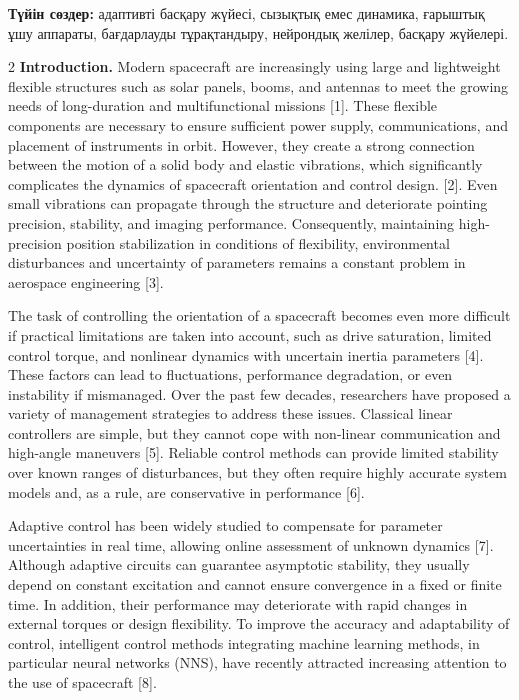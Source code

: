 {\bfseries Түйін сөздер:} адаптивті басқару жүйесі, сызықтық емес динамика,
ғарыштық ұшу аппараты, бағдарлауды тұрақтандыру, нейрондық желілер,
басқару жүйелері.

\begin{multicols}{2}
{\bfseries Introduction.} Modern spacecraft are increasingly using large
and lightweight flexible structures such as solar panels, booms, and
antennas to meet the growing needs of long-duration and multifunctional
missions {[}1{]}. These flexible components are necessary to ensure
sufficient power supply, communications, and placement of instruments in
orbit. However, they create a strong connection between the motion of a
solid body and elastic vibrations, which significantly complicates the
dynamics of spacecraft orientation and control design. {[}2{]}. Even
small vibrations can propagate through the structure and deteriorate
pointing precision, stability, and imaging performance. Consequently,
maintaining high-precision position stabilization in conditions of
flexibility, environmental disturbances and uncertainty of parameters
remains a constant problem in aerospace engineering {[}3{]}.

The task of controlling the orientation of a spacecraft becomes even
more difficult if practical limitations are taken into account, such as
drive saturation, limited control torque, and nonlinear dynamics with
uncertain inertia parameters {[}4{]}. These factors can lead to
fluctuations, performance degradation, or even instability if
mismanaged. Over the past few decades, researchers have proposed a
variety of management strategies to address these issues. Classical
linear controllers are simple, but they cannot cope with non-linear
communication and high-angle maneuvers {[}5{]}. Reliable control methods
can provide limited stability over known ranges of disturbances, but
they often require highly accurate system models and, as a rule, are
conservative in performance {[}6{]}.

Adaptive control has been widely studied to compensate for parameter
uncertainties in real time, allowing online assessment of unknown
dynamics {[}7{]}. Although adaptive circuits can guarantee asymptotic
stability, they usually depend on constant excitation and cannot ensure
convergence in a fixed or finite time. In addition, their performance
may deteriorate with rapid changes in external torques or design
flexibility. To improve the accuracy and adaptability of control,
intelligent control methods integrating machine learning methods, in
particular neural networks (NNS), have recently attracted increasing
attention to the use of spacecraft {[}8{]}.


\end{multicols}
